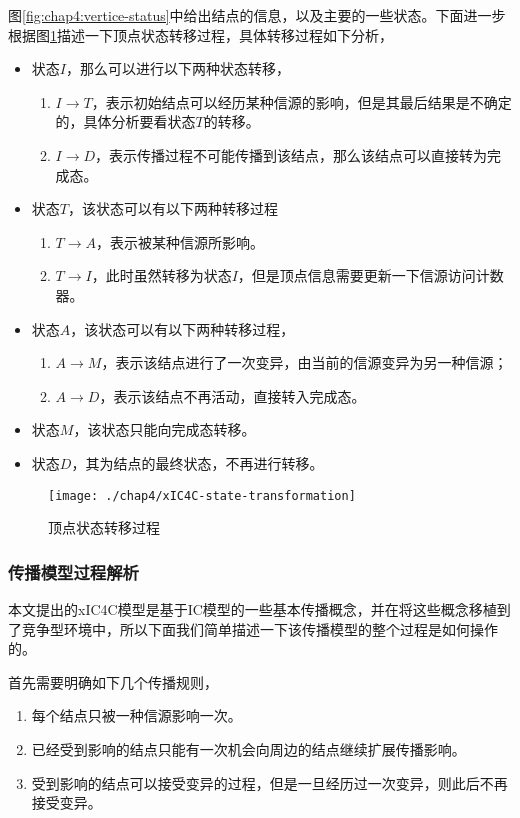 图\ref{fig:chap4:vertice-status}中给出结点的信息，以及主要的一些状态。下面进一步根据图\ref{fig:chap4:state-xformation}描述一下顶点状态转移过程，具体转移过程如下分析，
\begin{itemize}
\item 状态$I$，那么可以进行以下两种状态转移，
	\begin{enumerate}
	\item $I \rightarrow T$，表示初始结点可以经历某种信源的影响，但是其最后结果是不确定的，具体分析要看状态$T$的转移。
	\item $I \rightarrow D$，表示传播过程不可能传播到该结点，那么该结点可以直接转为完成态。
	\end{enumerate}
\item 状态$T$，该状态可以有以下两种转移过程
	\begin{enumerate}
	\item $T \rightarrow A$，表示被某种信源所影响。
	\item $T \rightarrow I$，此时虽然转移为状态$I$，但是顶点信息需要更新一下信源访问计数器。
	\end{enumerate}
\item 状态$A$，该状态可以有以下两种转移过程，
	\begin{enumerate}
	\item $A \rightarrow M$，表示该结点进行了一次变异，由当前的信源变异为另一种信源；
	\item $A \rightarrow D$，表示该结点不再活动，直接转入完成态。
	\end{enumerate}
\item 状态$M$，该状态只能向完成态转移。
\item 状态$D$，其为结点的最终状态，不再进行转移。
\end{itemize}

\begin{figure}[H]
	\centering%
	\texttt{[image: ./chap4/xIC4C-state-transformation]}
	\caption{顶点状态转移过程}
	\label{fig:chap4:state-xformation}
\end{figure}


\subsubsection{传播模型过程解析}
本文提出的xIC4C模型是基于IC模型的一些基本传播概念，并在将这些概念移植到了竞争型环境中，所以下面我们简单描述一下该传播模型的整个过程是如何操作的。


首先需要明确如下几个传播规则，
\begin{enumerate}
\item 每个结点只被一种信源影响一次。
\item 已经受到影响的结点只能有一次机会向周边的结点继续扩展传播影响。
\item 受到影响的结点可以接受变异的过程，但是一旦经历过一次变异，则此后不再接受变异。
\end{enumerate}


